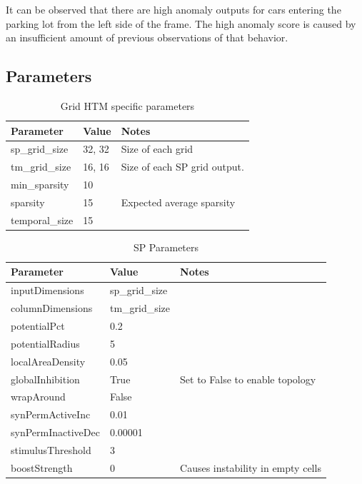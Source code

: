 It can be observed that there are high anomaly outputs for cars entering the parking lot from the left side of the frame. The high anomaly score is caused by an insufficient amount of previous observations of that behavior.
\subsection{Parameters}
\begin{table}[H]
    \centering
    \begin{tabularx}{\linewidth}{@{}XlX@{}}
        \toprule
        \textbf{Parameter} & \textbf{Value} & \textbf{Notes}               \\
        \midrule
        sp\_grid\_size     & 32, 32         & Size of each grid            \\
        tm\_grid\_size     & 16, 16         & Size of each SP grid output. \\
        min\_sparsity      & 10             &                              \\
        sparsity           & 15             & Expected average sparsity    \\
        temporal\_size     & 15             &                              \\
        \bottomrule
    \end{tabularx}
    \caption{Grid HTM specific parameters}
    \label{tab:surveillance_grid_htm}
\end{table}
\begin{table}[H]
    \centering
    \begin{tabularx}{\linewidth}{@{}XlX@{}}
        \toprule
        \textbf{Parameter} & \textbf{Value} & \textbf{Notes}                    \\
        \midrule
        inputDimensions    & sp\_grid\_size &                                   \\
        columnDimensions   & tm\_grid\_size &                                   \\
        potentialPct       & 0.2            &                                   \\
        potentialRadius    & 5              &                                   \\
        localAreaDensity   & 0.05           &                                   \\
        globalInhibition   & True           & Set to False to enable topology   \\
        wrapAround         & False          &                                   \\
        synPermActiveInc   & 0.01           &                                   \\
        synPermInactiveDec & 0.00001                                            \\
        stimulusThreshold  & 3              &                                   \\
        boostStrength      & 0              & Causes instability in empty cells \\
        \bottomrule
    \end{tabularx}
    \caption{SP Parameters}
    \label{tab:surveillance_sp}
\end{table}
